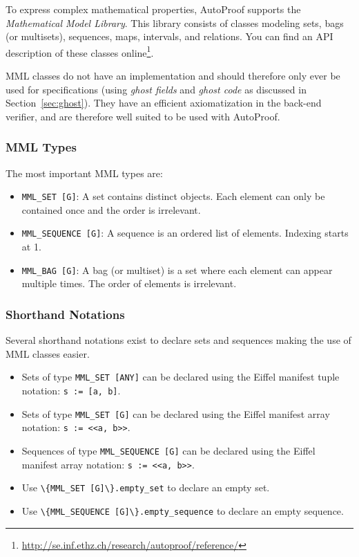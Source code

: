 \documentclass[a4paper,12pt]{article}
\newcommand{\AutoProof}{Auto\-Proof\xspace}
\newcommand{\e}[1]{\mbox{\lstinline[language=Eiffel]|#1|}}
\begin{document}
To express complex mathematical properties, \AutoProof supports the \emph{Mathematical Model Library}. This library consists of classes modeling sets, bags (or multisets), sequences, maps, intervals, and relations. You can find an API description of these classes online\footnote{\url{http://se.inf.ethz.ch/research/autoproof/reference/}}.

MML classes do not have an implementation and should therefore only ever be used for specifications (using \emph{ghost fields} and \emph{ghost code} as discussed in Section~\ref{sec:ghost}). They have an efficient axiomatization in the back-end verifier, and are therefore well suited to be used with \AutoProof.

\subsubsection*{MML Types}

The most important MML types are:
\begin{itemize}
\item \e{MML_SET [G]}: A set contains distinct objects. Each element can only be contained once and the order is irrelevant.
\item \e{MML_SEQUENCE [G]}: A sequence is an ordered list of elements. Indexing starts at 1.
\item \e{MML_BAG [G]}: A bag (or multiset) is a set where each element can appear multiple times. The order of elements is irrelevant.
\end{itemize}

\subsubsection*{Shorthand Notations}

Several shorthand notations exist to declare sets and sequences making the use of MML classes easier.
\begin{itemize}
\item Sets of type \e{MML_SET [ANY]} can be declared using the Eiffel manifest tuple notation: \e{s := [a, b]}.
\item Sets of type \e{MML_SET [G]} can be declared using the Eiffel manifest array notation: \e{s := <<a, b>>}.
\item Sequences of type \e{MML_SEQUENCE [G]} can be declared using the Eiffel manifest array notation: \e{s := <<a, b>>}.
\item Use \e{\{MML_SET [G]\}.empty_set} to declare an empty set.
\item Use \e{\{MML_SEQUENCE [G]\}.empty_sequence} to declare an empty sequence.
\end{itemize}
\end{document}

